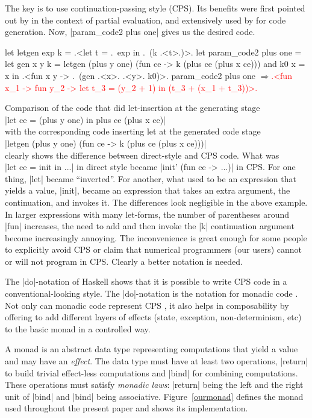 \documentclass{llncs}
\newcommand{\evalresult}[1]{\ensuremath{\Longrightarrow}\textcolor{red}{#1}}
\begin{document}
The key is to use continuation-passing style (CPS). Its benefits were first
pointed out by \cite{Bondorf:92} in the context
of partial evaluation, and extensively used by \cite{KiselyovTaha} for code
generation. Now, |param_code2 plus one| gives us the desired code. 

\begin{code}
let letgen exp k = .<let t = .~exp in .~(k .<t>.)>.
let param_code2 plus one =
  let gen x y k = letgen (plus y one) (fun ce -> k (plus ce (plus x ce)))
  and k0 x = x
  in .<fun x y -> .~(gen .<x>. .<y>. k0)>.
param_code2 plus one
\evalresult{.<fun x_1 -> fun y_2 -> let t_3 = (y_2 + 1) in (t_3 + (x_1 + t_3))>.}
\end{code}

\noindent Comparison of the code that did let-insertion at the generating stage\\
|let ce = (plus y one) in  plus ce (plus x ce)|\\
with the corresponding code inserting let at the generated code stage\\
|letgen (plus y one) (fun ce -> k (plus ce (plus x ce)))|\\
clearly shows the difference between  direct-style and CPS code.
What was\\ |let ce = init in ...| in direct style became
|init' (fun ce -> ...)| in CPS. For one thing, |let| became
``inverted''. For another, what used to be an expression that yields
a value, |init|, became an expression that takes an extra argument,
the continuation, and invokes it. The differences look negligible in
the above example. In larger expressions with many let-forms, the
number of parentheses around |fun| increases, the need to add and
then invoke the |k| continuation argument become increasingly annoying. The
inconvenience is great enough for some people to explicitly avoid CPS
or claim that numerical programmers (our users) cannot or will not
program in CPS. Clearly a better notation is needed.

The |do|-notation of Haskell \cite{Haskell98Report} shows that it is possible
to write CPS code in a conventional-looking style. The
|do|-notation is the notation for monadic code \cite{moggi-notions}.
Not only can monadic code represent CPS \cite{Filinski:Representing},
it also helps in composability by offering to add different
layers of effects (state, exception, non-determinism, etc) to the
basic monad \cite{liang-interpreter} in a controlled way.

A monad \cite{moggi-notions} is an abstract data type representing
computations that yield a value and may have an \emph{effect}.
The data type must have at least two operations, |return| to build
trivial effect-less computations and |bind| for combining
computations. These operations must satisfy \emph{monadic laws}:
|return| being the left and the right unit of |bind| and |bind| being
associative. Figure~\ref{ourmonad} defines the monad used throughout
the present paper and shows its implementation.
\end{document}
